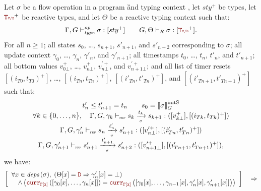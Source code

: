 \begin{lemma}
    \label{lem:semantics:grfrp:theorems:oversampling:op}
    Let $\sigma$ be a flow operation in a program \G and typing context \tyCtx, let $sty^+$ be
    types, let $\rType^+$ be reactive types, and let $\Theta$ be a reactive typing context such
    that:
    \begin{equation*}
        \flowTyped{\sigma}{sty^+} \qquad \opTypedReact{\Theta}{\sigma}{\rType^+}.
    \end{equation*}
    For
    all $n \ge 1$;
    all states $s_0$, \dots, $s_{n+1}$, $s'_{n+1}$, and $s'_{n+2}$ corresponding to $\sigma$;
    all update context $\gamma_0$, \dots, $\gamma_n$, $\gamma'_n$, and $\gamma'_{n+1}$;
    all timestamps $t_0$, \dots, $t_n$, $t'_n$, and $t'_{n+1}$;
    all bottom values $v_{0\bot}^+$, \dots, $v_{n\bot}^+$, $v_{n\bot}^{\prime+}$, and $v_{n+1\bot}^{\prime+}$; and
    all list of timer resets $[(i_{T0}, t_{T0})^+]$, \dots, $[(i_{Tn}, t_{Tn})^+]$, $[(i'_{Tn}, t'_{Tn})^+]$, and $[(i'_{Tn+1}, t'_{Tn+1})^+]$
    such that:
    \begin{equation*}
        \begin{array}{c}
            t'_n \le t'_{n+1} = t_n \qquad s_0 = \left\llbracket \sigma \right\rrbracket_G^\text{initS}                                                                \\
            \forall k \in \{0, \dots, n\}, \quad \Gamma, G, \gamma_k \vdash_{\textnormal{\tiny\textsc{frp}}} s_k \xrightarrow[\mbox{\tiny\ensuremath{\sigma}}]{t_k} s_{k+1}: ([v_{k\bot}^+], [(i_{Tk}, t_{Tk})^+]) \\
            \Gamma, G, \gamma'_n \vdash_{\textnormal{\tiny\textsc{frp}}} s_n \xrightarrow[\mbox{\tiny\ensuremath{\sigma}}]{t'_n} s'_{n+1}: ([v_{n\bot}^{\prime+}], [(i'_{Tn}, t'_{Tn})^+])                         \\
            \Gamma, G, \gamma'_{n+1} \vdash_{\textnormal{\tiny\textsc{frp}}} s'_{n+1} \xrightarrow[\mbox{\tiny\ensuremath{\sigma}}]{t'_{n+1}} s'_{n+2}: ([v_{n+1\bot}^{\prime+}], [(i'_{Tn+1}, t'_{Tn+1})^+]),
        \end{array}
    \end{equation*}
    we have:
    \begin{multline*}
        \left[\begin{array}{l}
                \forall x \in \depSet{\sigma}, \; \left(\Theta[x] = \dType \Rightarrow \gamma'_n[x] = \bot\right) \\
                \quad \wedge \left(\CurrVal{\tyCtx[x]}{[\gamma_0[x], \dots, \gamma_n[x]]} = \CurrVal{\tyCtx[x]}{[\gamma_0[x], \dots, \gamma_{n-1}[x], \gamma'_n[x], \gamma'_{n+1}[x]]}\right)
            \end{array}\right]
        \quad \Rightarrow \\

\end{multline*}
\end{lemma}
